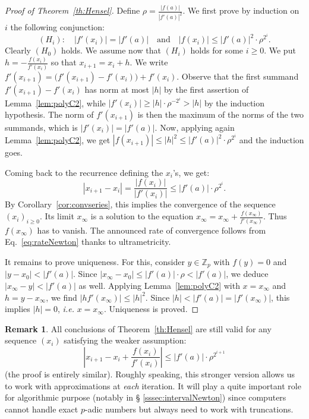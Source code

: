 \documentclass[11pt]{article}
\numberwithin{equation}{section}
\numberwithin{figure}{section}
\renewcommand{\leq}{\leqslant}
\renewcommand{\geq}{\geqslant}
\theoremstyle{definition}
\newtheorem{rem}[theo]{Remark}
\newcommand{\Z}{\mathbb Z}
\newcommand{\Zp}{\Z_p}
\begin{document}
\begin{proof}[Proof of Theorem~\ref{th:Hensel}]
Define $\rho = \frac{|f(a)|}{|f'(a)|^2}$. 
We first prove by induction on $i$ the following conjunction:
$$(H_i) : \quad |f'(x_i)| = |f'(a)|
\quad \text{and} \quad |f(x_i)| \leq |f'(a)|^2 \cdot \rho^{2^i}.$$
Clearly $(H_0)$ holds. We assume now that $(H_i)$ holds for some $i 
\geq 0$. We put $h
= -\frac{f(x_i)}{f'(x_i)}$ so that $x_{i+1} = x_i + h$. We write
$f'(x_{i+1}) = \big(f'(x_{i+1}) - f'(x_i)\big) + f'(x_i)$.
Observe that the first summand $f'(x_{i+1}) - f'(x_i)$ has norm at 
most $|h|$ by the first assertion of Lemma~\ref{lem:polyC2}, while 
$|f'(x_i)| \geq |h| \cdot \rho^{-2^i} > |h|$ by the induction 
hypothesis.
The norm of $f'(x_{i+1})$ is then the maximum of the norms of the two
summands, which is $|f'(x_i)| = |f'(a)|$.
Now, applying again Lemma~\ref{lem:polyC2}, we get $|f(x_{i+1})| \leq 
|h|^2 \leq |f'(a)|^2 \cdot \rho^{2^i}$ and the induction goes.

Coming back to the recurrence defining the $x_i$'s, we get:
\begin{equation}
\label{eq:rateNewton}
|x_{i+1} - x_i| = \frac{|f(x_i)|}{|f'(x_i)|} \leq |f'(a)| \cdot 
\rho^{2^i}.
\end{equation}
By Corollary~\ref{cor:convseries}, this implies the convergence
of the sequence $(x_i)_{i \geq 0}$. Its limit $x_\infty$ is a 
solution to the equation $x_\infty = x_\infty + 
\frac{f(x_\infty)}{f'(x_\infty)}$. Thus $f(x_\infty)$ has to vanish. 
The announced rate of convergence follows from Eq.~\eqref{eq:rateNewton} 
thanks to ultrametricity.

It remains to prove uniqueness. For this, consider $y \in \Zp$
with $f(y) = 0$ and $|y - x_0| < |f'(a)|$. Since $|x_\infty - x_0|
\leq |f'(a)| \cdot \rho < |f'(a)|$, we deduce $|x_\infty - y| <
|f'(a)|$ as well. Applying Lemma~\ref{lem:polyC2} with $x = x_\infty$
and $h = y - x_\infty$, we find $|h f'(x_\infty)| \leq |h|^2$. Since 
$|h| < |f'(a)| = |f'(x_\infty)|$, this implies $|h| = 0$, 
\emph{i.e.} $x = x_\infty$. Uniqueness is proved.
\end{proof}

\begin{rem}
\label{rem:Hensel}
All conclusions of Theorem~\ref{th:Hensel} are still valid for any
sequence $(x_i)$ satisfying the weaker assumption:
$$\left|x_{i+1} - x_i + \frac{f(x_i)}{f'(x_i)}\right| 
\leq |f'(a)| \cdot \rho^{2^{i+1}}$$
(the proof is entirely similar). Roughly speaking, this stronger version 
allows us to work with approximations at \emph{each} iteration. It will 
play a quite important role for algorithmic purpose (notably in \S 
\ref{sssec:intervalNewton}) since computers cannot handle exact $p$-adic 
numbers but always need to work with truncations.
\end{rem}
\end{document}
